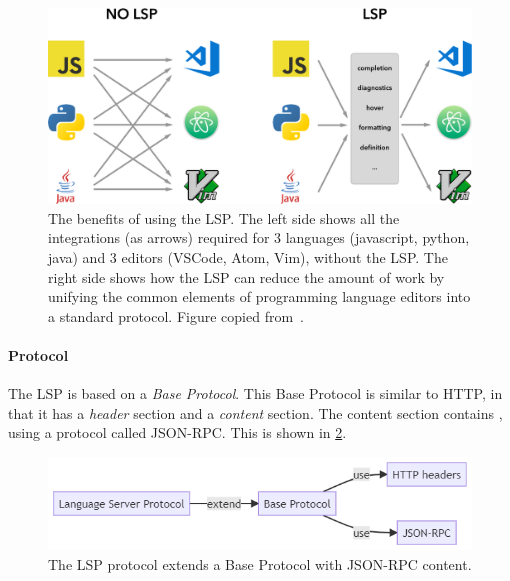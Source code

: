 \begin{figure}[htbp]  %
  \centering
  \includegraphics[width=\textwidth]{figures/pre-project/lsp-languages-editors.png}
  \caption[The Language Server Protocol Benefits]{The benefits of using the \acrshort{LSP}. The left side shows all the integrations (as arrows) required for 3 languages (javascript, python, java) and 3 editors (VSCode, Atom, Vim), without the \acrshort{LSP}.
  The right side shows how the \acrshort{LSP} can reduce the amount of work by unifying the common elements of programming language editors into a standard protocol. Figure copied from~\textcite{microsoftLanguageServerExtension2020}.}\label{fig:lsp-m-times-n}
\end{figure}

\paragraph{Protocol}
The \acrlong{LSP} is based on a \textit{Base Protocol}.
This Base Protocol is similar to HTTP, in that it has a \textit{header} section and a \textit{content} section.
The content section contains , using a protocol called \gls{JSON-RPC}.
This is shown in \cref{fig:lsp-architecture}.

\begin{figure}[htbp]  %
  \centering
  \includegraphics[width=\textwidth]{figures/pre-project/lsp-protocol.png}
  \caption[LSP Protocol Design]{The \acrlong{LSP} protocol extends a Base Protocol with JSON-RPC content.}\label{fig:lsp-architecture}
\end{figure}

